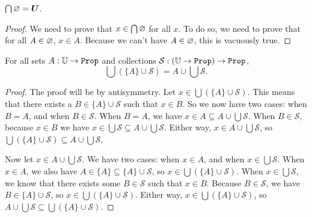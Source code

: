 \documentclass[../../math.tex]{subfiles}
\begin{document}
\begin{theorem}
    $\bigcap \varnothing = \bm U$.
\end{theorem}
\begin{proof}
    We need to prove that $x \in \bigcap \varnothing$ for all $x$.  To do so, we need
    to prove that for all $A \in \varnothing$, $x \in A$.  Because we can't have $A
    \in \varnothing$, this is vacuously true.
\end{proof}

\begin{theorem}
    For all sets $A : \U \rightarrow \Prop$ and collections $\mathcal S : (\U
    \rightarrow \Prop) \rightarrow \Prop$,
    \[
        \bigcup (\{A\} \cup \mathcal S) = A \cup \bigcup \mathcal S.
    \]
\end{theorem}
\begin{proof}
    The proof will be by antisymmetry.  Let $x \in \bigcup (\{A\} \cup \mathcal
    S)$.  This means that there exists a $B \in \{A\} \cup \mathcal S$ such that
    $x \in B$.  So we now have two cases: when $B = A$, and when $B \in \mathcal
    S$.  When $B = A$, we have $x \in A \subseteq A \cup \bigcup \mathcal S$.
    When $B \in \mathcal S$, because $x \in B$ we have $x \in \bigcup \mathcal S
    \subseteq A \cup \bigcup \mathcal S$.  Either way, $x \in A \cup \bigcup
    \mathcal S$, so $\bigcup (\{A\} \cup \mathcal S) \subseteq A \cup \bigcup
    \mathcal S$.

    Now let $x \in A \cup \bigcup \mathcal S$.  We have two cases: when $x \in
    A$, and when $x \in \bigcup \mathcal S$.  When $x \in A$, we also have $A
    \in \{A\} \subseteq \{A\} \cup \mathcal S$, so $x \in \bigcup(\{A\} \cup
    \mathcal S)$.  When $x \in \bigcup \mathcal S$, we know that there exists
    some $B \in \mathcal S$ such that $x \in B$.  Because $B \in \mathcal S$, we
    have $B \in \{A\} \cup \mathcal S$, so $x \in \bigcup(\{A\} \cup \mathcal
    S)$.  Either way, $x \in \bigcup(\{A\} \cup \mathcal S)$, so $A \cup \bigcup
    \mathcal S \subseteq \bigcup(\{A\} \cup \mathcal S)$.
\end{proof}
\end{document}
